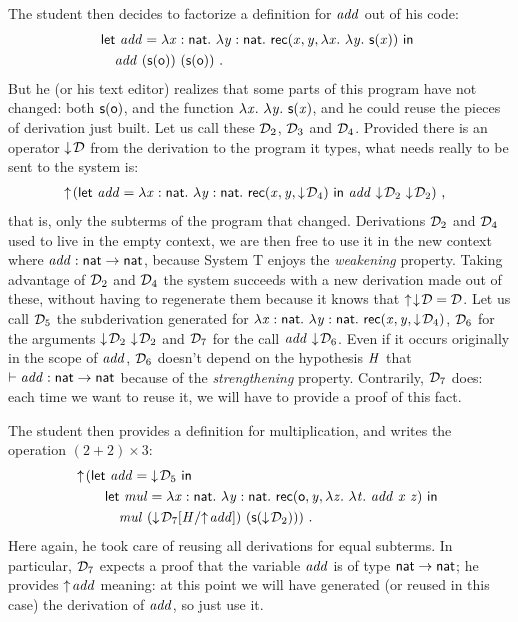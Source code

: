 \documentclass[9pt]{sigplanconf}
\begin{document}
The student then decides to factorize a definition for $\var{add}$ out
of his code:
\begin{align*}
  &\letb{add}{\tlam x {\cst{nat}} \tlam y {\cst{nat}} \recb {\var x}
    {\var y} {\lam x \lam y \s{\var x}}}
  \\
  &\quad\app{\var{add}}\app{(\s\z)}{(\s\z)} \ \text{.}
\end{align*}
But he (or his text editor) realizes that some parts of this program
have not changed: both $\s\z$, and the function $\lam x\lam y\s{\var
  x}$, and he could reuse the pieces of derivation just built. Let us
call these $\md_2$, $\md_3$ and $\md_4$. Provided there is an operator
$\get\md$ from the derivation to the program it types, what needs
really to be sent to the system is:
\begin{align*}
  &\finfer{(
    \letb{add}{\tlam x {\cst{nat}} \tlam y {\cst{nat}} \recb {\var x}
      {\var y} {\get{\md_4}}}
    \app{\var{add}}\app{\get{\md_2}}{\get{\md_2}}
  )}
\ \text{,}
\end{align*}
that is, only the subterms of the program that changed. Derivations
$\md_2$ and $\md_4$ used to live in the empty context, we are then
free to use it in the new context where
$\var{add}:\cst{nat}\to\cst{nat}$, because System \sysname T enjoys
the \emph{weakening} property. Taking advantage of $\md_2$ and $\md_4$
the system succeeds with a new derivation made out of these, without
having to regenerate them because it knows that $\finfer{\get\md} =
\md$. Let us call $\md_5$ the subderivation generated for $\tlam x
{\cst{nat}} \tlam y {\cst{nat}} \recb {\var x} {\var y}
{\get{\md_4}}$, $\md_6$ for the arguments
$\app{\get{\md_2}}{\get{\md_2}}$ and $\md_7$ for the call
$\app{\var{add}} {\get{\md_6}}$. Even if it occurs originally in the
scope of $\var{add}$, $\md_6$ doesn't depend on the hypothesis $\var
H$ that $\vdash \var{add}:\cst{nat}\to\cst{nat}$ because of the
\emph{strengthening} property. Contrarily, $\md_7$ does: each time we
want to reuse it, we will have to provide a proof of this fact.

The student then provides a definition for multiplication, and writes
the operation $(2 + 2)\times3$:
\begin{align*}
  \finfer{}(
  &\letb{add}{\get{\md_5}}
  \\
  &\quad\letb{mul} { \tlam x {\cst{nat}} \tlam y
    {\cst{nat}} \recb \z {\var y} {\lam z \lam t
      \app{\var{add}}\app{\var x} {\var z}} }
  \\
  &\quad\quad\app{\var{mul}}\app
  {(\get{\gsubst{\md_7}{\msubst H {\finfer{\var{add}}}}})}
  {(\s{\get{\md_2}})}
  )
  \ \text{.}
\end{align*}
Here again, he took care of reusing all derivations for equal
subterms. In particular, $\md_7$ expects a proof that the variable
$\var{add}$ is of type $\cst{nat}\to\cst{nat}$; he provides
$\finfer{\var{add}}$ meaning: at this point we will have generated (or
reused in this case) the derivation of $\var{add}$, so just use it.
\end{document}
